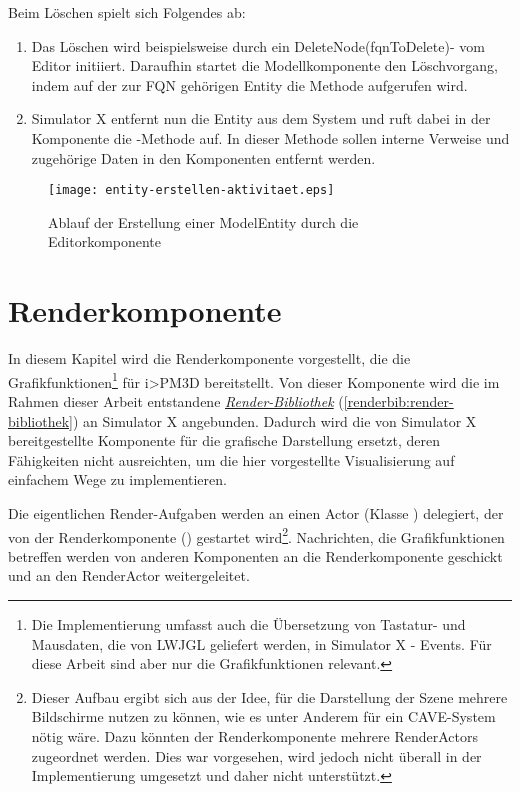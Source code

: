 \documentclass[a4paper,10pt]{sphinxmanual}
\begin{document}
Beim Löschen spielt sich Folgendes ab:
\begin{enumerate}
\item {} 
Das Löschen wird beispielsweise durch ein DeleteNode(fqnToDelete)- vom Editor initiiert. Daraufhin startet die Modellkomponente den Löschvorgang, indem auf der zur FQN gehörigen Entity die Methode  aufgerufen wird.

\item {} 
Simulator X entfernt nun die Entity aus dem System und ruft dabei in der Komponente die -Methode auf. In dieser Methode sollen interne Verweise und zugehörige Daten in den Komponenten entfernt werden.

\end{enumerate}
\begin{figure}[htbp]
\centering
\capstart

\texttt{[image: entity-erstellen-aktivitaet.eps]}
\caption{Ablauf der Erstellung einer ModelEntity durch die Editorkomponente}\label{modellanbindung:entity-erstellen-aktivitaet}\end{figure}


\chapter{Renderkomponente}
\label{renderkomponente:renderkomponente}\label{renderkomponente::doc}\label{renderkomponente:id1}
In diesem Kapitel wird die Renderkomponente vorgestellt, die die Grafikfunktionen\footnote{
Die Implementierung umfasst auch die Übersetzung von Tastatur- und Mausdaten, die von LWJGL geliefert werden, in Simulator X - Events. Für diese Arbeit sind aber nur die Grafikfunktionen relevant.
} für i\textgreater{}PM3D bereitstellt.
Von dieser Komponente wird die im Rahmen dieser Arbeit entstandene {\hyperref[renderbib:render-bibliothek]{\emph{Render-Bibliothek}}} (\autoref*{renderbib:render-bibliothek}) an Simulator X angebunden.
Dadurch wird die von Simulator X bereitgestellte Komponente für die grafische Darstellung ersetzt, deren Fähigkeiten nicht ausreichten, um die hier vorgestellte Visualisierung auf einfachem Wege zu implementieren.

Die eigentlichen Render-Aufgaben werden an einen Actor (Klasse ) delegiert, der von der Renderkomponente () gestartet wird\footnote{
Dieser Aufbau ergibt sich aus der Idee, für die Darstellung der Szene mehrere Bildschirme nutzen zu können, wie es unter Anderem für ein CAVE-System nötig wäre. Dazu könnten der Renderkomponente mehrere RenderActors zugeordnet werden. Dies war vorgesehen, wird jedoch nicht überall in der Implementierung umgesetzt und daher nicht unterstützt.
}.
Nachrichten, die Grafikfunktionen betreffen werden von anderen Komponenten an die Renderkomponente geschickt und an den RenderActor weitergeleitet.
\end{document}

